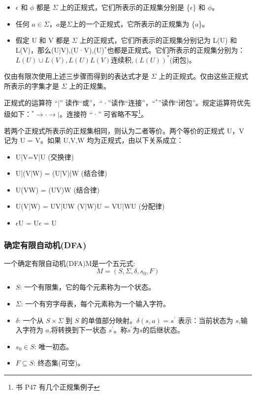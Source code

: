 \begin{itemize}
    \item $\epsilon$ 和 $\phi$ 都是 $\Sigma$ 上的正规式，它们所表示的正规集分别是 \{$\epsilon$\} 和 $\phi$。
    \item 任何 $a\in\Sigma$，$a$是$\Sigma$上的一个正规式，它所表示的正规集为 \{$a$\}。
    \item 假定 U 和 V 都是 $\Sigma$ 上的正规式，它们所表示的正规集分别记为 L(U) 和 L(V)，那么(U|V),(U·V),(U)$^{*}$也都是正规式。它们所表示的正规集分别为：$L(U)\cup L(V),L(U) L(V)$连续积,$(L(U))^{*}$(闭包)。
\end{itemize}

仅由有限次使用上述三步骤而得到的表达式才是 $\Sigma$ 上的正规式。仅由这些正规式所表示的字集才是 $\Sigma$ 上的正规集。

正规式的运算符 ``|'' 读作``或''，``·''读作``连接''，``$^{*}$''读作``闭包''。规定运算符优先级如下：$^{*} \rightarrow \text{·} \rightarrow |$。连接符 ``·'' 可省略不写\footnote{书 P47 有几个正规集例子}。 

若两个正规式所表示的正规集相同，则认为二者等价。两个等价的正规式 U，V 记为 U = V。如果 U,V,W 均为正规式，由以下关系成立：

\begin{itemize}
    \item U|V=V|U \hfill (交换律)
    \item U|(V|W) = (U|V)|W \hfill (结合律)
    \item U(VW) = (UV)W \hfill (结合律)
    \item U(V|W) = UV|UW \quad (V|W)U = VU|WU  \hfill (分配律)
    \item $\epsilon$U = U$\epsilon$ = U
\end{itemize}

\subsubsection{确定有限自动机(DFA)}

一个确定有限自动机(DFA)M是一个五元式:
\[ M = (S,\Sigma,\delta,s_0,F) \]

\begin{itemize}
    \item $S$: 一个有限集，它的每个元素称为一个状态。
    \item $\Sigma$: 一个有穷字母表，每个元素称为一个输入字符。
    \item $\delta$: 一个从 $S \times \Sigma$ 到 $S$ 的单值部分映射。$\delta(s,a)=s^{'}$ 表示：当前状态为 $s$,输入字符为 $a$,将转换到下一状态 $s^{'}$。称$s^{'}$为$s$的后继状态。
    \item $s_0\in S$: 唯一初态。
    \item $F\subseteq S$: 终态集(可空)。
\end{itemize}

